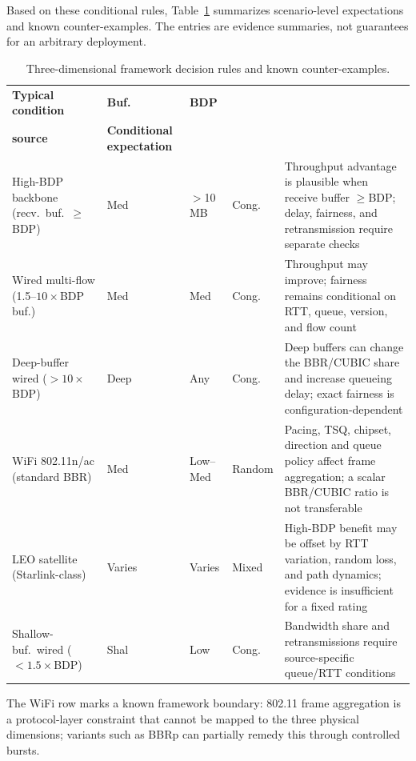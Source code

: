 \documentclass[a4paper,fleqn]{cas-sc}
\begin{document}
Based on these conditional rules, Table~\ref{tab:decision_rules} summarizes
scenario-level expectations and known counter-examples. The entries are evidence
summaries, not guarantees for an arbitrary deployment.

\begin{table}[pos=tbp]
  \caption{Three-dimensional framework decision rules and known counter-examples.}
  \label{tab:decision_rules}
  \small
  \begin{tabularx}{\tblwidth}{@{}p{3.8cm}p{1.0cm}p{1.3cm}p{1.6cm}X@{}}
    \toprule
    \textbf{Typical condition} & \textbf{Buf.} & \textbf{BDP} & \makecell[l]{\textbf{Loss}\\\textbf{source}}
      & \textbf{Conditional expectation} \\
    \midrule
    High-BDP backbone (recv.\ buf.\ $\geq$BDP) & Med & $>$10\,MB & Cong.
      & Throughput advantage is plausible when receive buffer $\geq$BDP; delay, fairness, and retransmission require separate checks \\
    \midrule
    Wired multi-flow (1.5--$10\times$BDP buf.) & Med & Med & Cong.
      & Throughput may improve; fairness remains conditional on RTT, queue, version, and flow count \\
    \midrule
    Deep-buffer wired ($>10\times$BDP) & Deep & Any & Cong.
      & Deep buffers can change the BBR/CUBIC share and increase queueing delay; exact fairness is configuration-dependent \\
    \midrule
    WiFi 802.11n/ac (standard BBR) & Med & Low--Med & Random
      & Pacing, TSQ, chipset, direction and queue policy affect frame aggregation; a scalar BBR/CUBIC ratio is not transferable \\
    \midrule
    LEO satellite (Starlink-class) & Varies & Varies & Mixed
      & High-BDP benefit may be offset by RTT variation, random loss, and path dynamics; evidence is insufficient for a fixed rating \\
    \midrule
    Shallow-buf.\ wired ($<1.5\times$BDP) & Shal & Low & Cong.
      & Bandwidth share and retransmissions require source-specific queue/RTT conditions \\
    \bottomrule
  \end{tabularx}
  \begin{tablenotes}
    \small
    \item The WiFi row marks a known framework boundary:
    802.11 frame aggregation is a protocol-layer constraint that cannot be mapped to the
    three physical dimensions; variants such as BBRp can partially remedy this through
    controlled bursts.
  \end{tablenotes}
\end{table}
\end{document}
